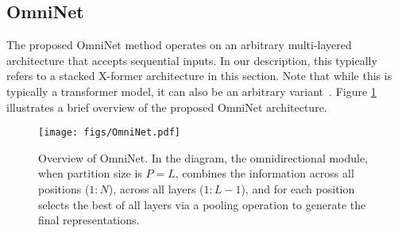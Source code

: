 \documentclass{article}
\begin{document}
\subsection{OmniNet}


The proposed OmniNet method operates on an arbitrary multi-layered architecture that accepts sequential inputs. In our description, this typically refers to a stacked X-former architecture in this section. Note that while this is typically a transformer model, it can also be an arbitrary variant~\citep{choromanski2020rethinking,wang2020linformer}. Figure \ref{fig:omninet_diagram} illustrates a brief overview of the proposed OmniNet architecture.

\begin{figure}
    \centering
    \texttt{[image: figs/OmniNet.pdf]}
    \vspace{-10pt}
    \caption{Overview of OmniNet. In the diagram, the omnidirectional module, when partition size is $P=L$, combines the information across all positions ($1:N$), across all layers ($1:L-1$), and for each position selects the best of all layers via a pooling operation to generate the final representations.}
    \label{fig:omninet_diagram}
    \vspace{-10pt}
\end{figure}
\end{document}
